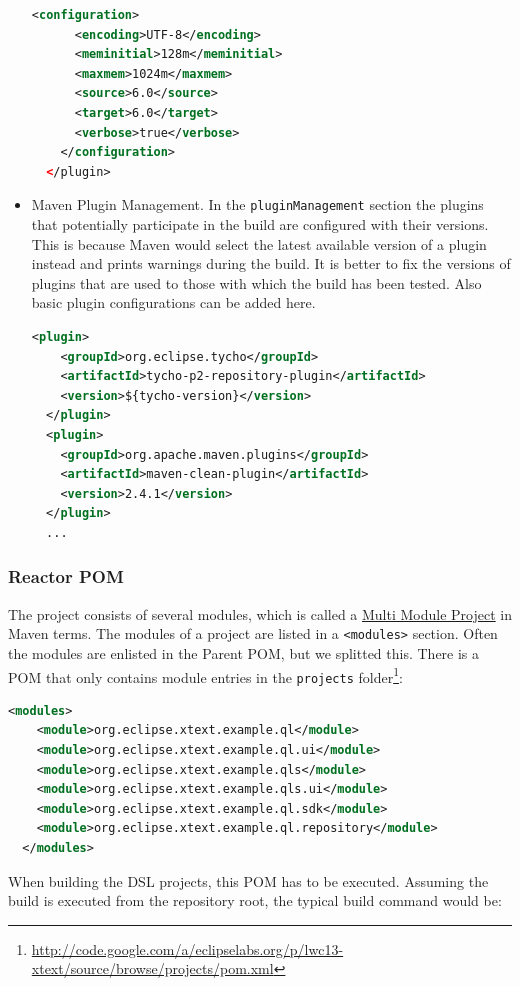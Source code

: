 \begin{itemize}
\begin{lstlisting}[language=XML]
    <configuration>
      <encoding>UTF-8</encoding>
      <meminitial>128m</meminitial>
      <maxmem>1024m</maxmem>
      <source>6.0</source>
      <target>6.0</target>
      <verbose>true</verbose>
    </configuration>
  </plugin>
\end{lstlisting}
\item Maven Plugin Management. In the \texttt{pluginManagement} section the plugins that
potentially participate in the build are configured with their versions. This is
because Maven would select the latest available version of a plugin instead and
prints warnings during the build. It is better to fix the versions of plugins
that are used to those with which the build has been tested. Also basic plugin
configurations can be added here.
\begin{lstlisting}[language=XML]
  <plugin>
    <groupId>org.eclipse.tycho</groupId>
    <artifactId>tycho-p2-repository-plugin</artifactId>
    <version>${tycho-version}</version>
  </plugin>
  <plugin>
    <groupId>org.apache.maven.plugins</groupId>
    <artifactId>maven-clean-plugin</artifactId>
    <version>2.4.1</version>
  </plugin>
  ...
\end{lstlisting}
\end{itemize}

\subsubsection{Reactor POM}
The project consists of several modules, which is called a
\href{http://www.sonatype.com/books/mvnex-book/reference/multimodule.html}{Multi
Module Project} in Maven terms. The modules of a project are listed in a
\texttt{<modules>} section. Often the modules are enlisted in the Parent POM,
but we splitted this. There is a POM that only contains module entries in the
\texttt{projects}
folder\footnote{\url{http://code.google.com/a/eclipselabs.org/p/lwc13-xtext/source/browse/projects/pom.xml}}:

\begin{lstlisting}[language=XML]
  <modules>
    <module>org.eclipse.xtext.example.ql</module>
    <module>org.eclipse.xtext.example.ql.ui</module>
    <module>org.eclipse.xtext.example.qls</module>
    <module>org.eclipse.xtext.example.qls.ui</module>
    <module>org.eclipse.xtext.example.ql.sdk</module>
    <module>org.eclipse.xtext.example.ql.repository</module>
  </modules>
\end{lstlisting}

When building the DSL projects, this POM has to be executed. Assuming the build
is executed from the repository root, the typical build command would be:

